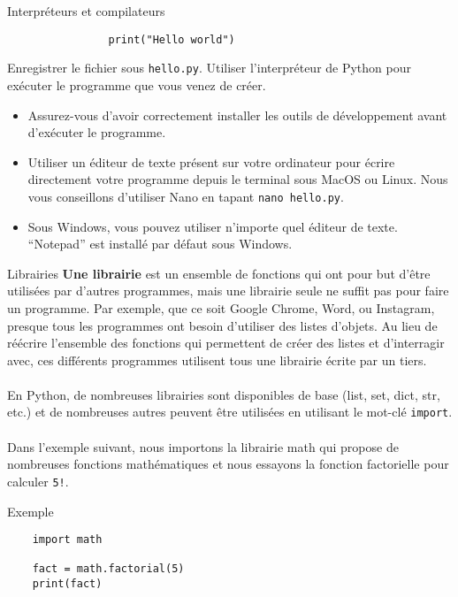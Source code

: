 \begin{section}{Interpréteurs et compilateurs}
\begin{Exercice}[10 minutes]
\begin{lstlisting}
                print("Hello world")\end{lstlisting}
        Enregistrer le fichier sous \lstinline{hello.py}. Utiliser l'interpréteur de Python pour exécuter le programme que vous venez de créer.
    \end{Exercice}
    \begin{conseil}
        \begin{itemize}
            \item Assurez-vous d'avoir correctement installer les outils de développement avant d'exécuter le programme.
            \item Utiliser un éditeur de texte présent sur votre ordinateur pour écrire directement votre programme depuis le terminal sous MacOS ou Linux. Nous vous conseillons d'utiliser Nano en tapant \lstinline{nano hello.py}.
            \item Sous Windows, vous pouvez utiliser n'importe quel éditeur de texte. ``Notepad'' est installé par défaut sous Windows.
        \end{itemize}
    \end{conseil}    
    

\end{section}

\begin{section}{Librairies}
    \textbf{Une librairie} est un ensemble de fonctions qui ont pour but d'être utilisées par d'autres programmes, mais une librairie seule ne suffit pas pour faire un programme. Par exemple, que ce soit Google Chrome, Word, ou Instagram, presque tous les programmes ont besoin d'utiliser des listes d'objets. Au lieu de réécrire l'ensemble des fonctions qui permettent de créer des listes et d'interragir avec, ces différents programmes utilisent tous une librairie écrite par un tiers.
\\\\
En Python, de nombreuses librairies sont disponibles de base (list, set, dict, str, etc.) et de nombreuses autres peuvent être utilisées en utilisant le mot-clé \lstinline{import}.
\\\\
Dans l'exemple suivant, nous importons la librairie math qui propose de nombreuses fonctions mathématiques et nous essayons la fonction factorielle pour calculer \lstinline{5!}.
\begin{Example}{\faTerminal Exemple}
    \begin{lstlisting}
    import math

    fact = math.factorial(5)
    print(fact)\end{lstlisting}
\end{Example}
    
\end{section}




